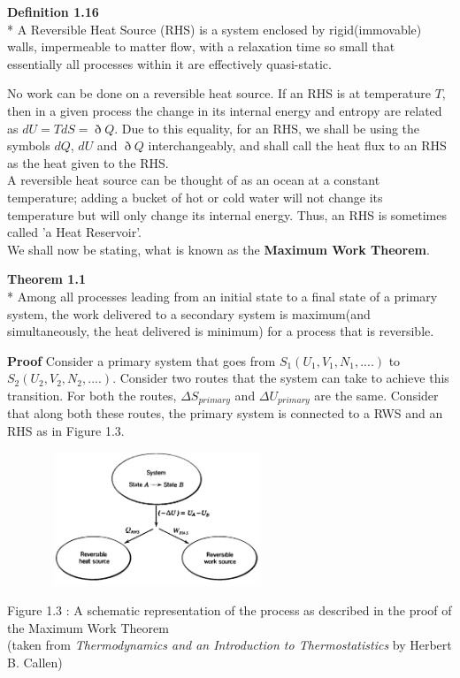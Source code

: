 \documentclass[oneside]{book}
\begin{document}
	\begin{mdframed}[style=exercise]
\textbf{Definition 1.16}
 \\* A Reversible Heat Source (RHS) is a system enclosed by rigid(immovable) walls, impermeable to matter flow, with a relaxation time so small that essentially all processes within it are effectively quasi-static. 
\end{mdframed}
No work can be done on a reversible heat source. If an RHS is at temperature $T$, then in a given process the change in its internal energy and entropy are related as $dU = TdS = \eth Q$. Due to this equality, for an RHS, we shall be using the symbols $dQ$, $dU$ and $\eth Q$ interchangeably, and shall call the heat flux to an RHS as the heat given to the RHS.\\

 A reversible heat source can be thought of as an ocean at a constant temperature; adding a bucket of hot or cold water will not change its temperature but will only change its internal energy. Thus, an RHS is sometimes called 'a Heat Reservoir'. \\

We shall now be stating, what is known as the \textbf{Maximum Work Theorem}.
	\begin{mdframed}[style=exercise]
\textbf{Theorem 1.1}
 \\* Among all processes leading from an initial state to a final state of a primary system, the work delivered to a secondary system is maximum(and simultaneously, the heat delivered is minimum) for a process that is reversible.
 \end{mdframed}
 
\textbf{Proof} Consider a primary system that goes from $S_1(U_1,V_1,N_1,....)$ to $S_2(U_2,V_2,N_2,....)$. Consider two routes that the system can take to achieve this transition. For both the routes, $\Delta S_{primary}$ and $\Delta U_{primary}$ are the same. Consider that along both these routes, the primary system is connected to a RWS and an RHS as in Figure 1.3.\\ 
\begin{center}
\includegraphics[width = 9cm, height = 4cm]{Work}
\end{center}
\begin{center}
Figure 1.3 : A schematic representation of the process as described in the proof of the Maximum Work Theorem\\
(taken from \emph{Thermodynamics and an Introduction to Thermostatistics} by Herbert B. Callen)
\end{center}
\end{document}
